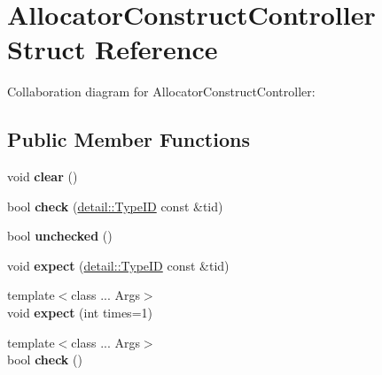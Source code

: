 \hypertarget{struct_allocator_construct_controller}{}\section{Allocator\+Construct\+Controller Struct Reference}
\label{struct_allocator_construct_controller}


Collaboration diagram for Allocator\+Construct\+Controller\+:
\subsection*{Public Member Functions}
\begin{DoxyCompactItemize}
\item 
\mbox{\label{struct_allocator_construct_controller_ae1b4a1ffce7a2ac10b7ba7d83037a5d7}} 
void {\bfseries clear} ()
\item 
\mbox{\label{struct_allocator_construct_controller_a513fe48f71bfe4a17f4181cebb6f87d8}} 
bool {\bfseries check} (\mbox{\hyperlink{structdetail_1_1_type_i_d}{detail\+::\+Type\+ID}} const \&tid)
\item 
\mbox{\label{struct_allocator_construct_controller_ae6ee87d9c0624c81fbf8bcd3252397cb}} 
bool {\bfseries unchecked} ()
\item 
\mbox{\label{struct_allocator_construct_controller_a3d25a4aa2d06cb8b39f579f9c4c0b6eb}} 
void {\bfseries expect} (\mbox{\hyperlink{structdetail_1_1_type_i_d}{detail\+::\+Type\+ID}} const \&tid)
\item 
\mbox{\label{struct_allocator_construct_controller_a0add23dea14705f7836326752d9eaaac}} 
{\footnotesize template$<$class ... Args$>$ }\\void {\bfseries expect} (int times=1)
\item 
\mbox{\label{struct_allocator_construct_controller_aa52f561907fcdfb9ba0f249781d66fac}} 
{\footnotesize template$<$class ... Args$>$ }\\bool {\bfseries check} ()
\item 

\end{DoxyCompactItemize}

